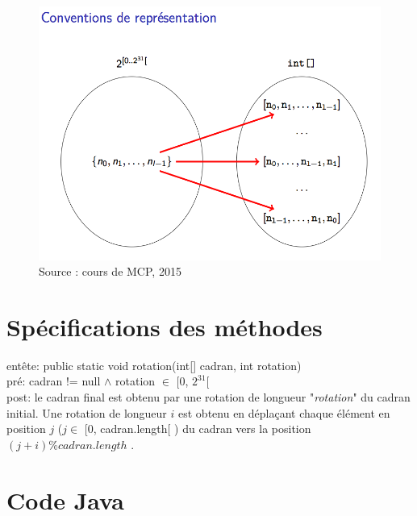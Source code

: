 \documentclass[a4paper, 12pt]{article}
\begin{document}
\begin{figure}[h]
   \includegraphics[scale=0.5]{Conventions.png}
   \caption{Source : cours de MCP, 2015}
\end{figure}

\section{Spécifications des méthodes}

entête: public static void rotation(int[] cadran, int rotation)\\

pré: cadran != null $\wedge$ rotation $\in$ [0, $2^{31}$[\\

post: le cadran final est obtenu par une rotation de longueur "\textit{rotation}" du cadran initial. Une rotation de longueur $i$ est obtenu en déplaçant chaque élément en position $j$ ($j \in$ [0, cadran.length[ ) du cadran vers la position $(j+i)\%cadran.length$ .

\newpage
\section{Code Java}
\end{document}
